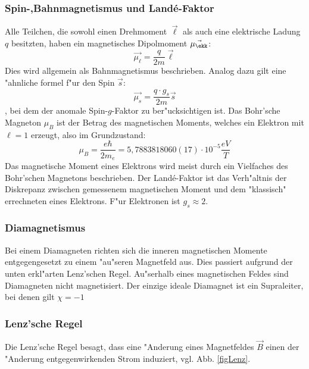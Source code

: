         \subsubsection*{Spin-,Bahnmagnetismus und Land\'e-Faktor}
            Alle Teilchen, die sowohl einen Drehmoment $\vec{\ell}$ als auch eine elektrische Ladung $q$ besitzten, haben ein magnetisches Dipolmoment $\vec{\mu_{\ekk}}$:
            \begin{equation}
                \vec{\mu_{\ell}} = \frac{q}{2m} \vec{\ell}
            \end{equation}
            Dies wird allgemein als Bahnmagnetismus beschrieben. Analog dazu gilt eine "ahnliche formel f"ur den Spin $\vec{s}$:
            \begin{equation}
                \vec{\mu_s} = \frac{q\cdot g_s}{2m} \vec{s}
            \end{equation},
            bei dem der anomale Spin-$g$-Faktor zu ber"ucksichtigen ist.
            Das Bohr'sche Magneton $\mu_B$ ist der Betrag des magnetischen Moments, welches ein Elektron
            mit $\ell=1$ erzeugt, also im Grundzustand:
            \begin{equation}
                \mu_B = \frac{e \hbar}{2 m_e} = 5,7883818060(17)\cdot 10^{-5} \frac{eV}{T}
            \end{equation}
            Das magnetische Moment eines Elektrons wird meist durch ein Vielfaches des Bohr'schen
            Magnetons beschrieben.
            Der Land\'e-Faktor ist das Verh"altnis der Diskrepanz zwischen gemessenem magnetischen Moment
            und dem "klassisch" errechneten eines Elektrons. F"ur Elektronen ist $g_s \approx 2$.
        \subsubsection*{Diamagnetismus}
            Bei einem Diamagneten richten sich die inneren magnetischen Momente entgegengesetzt
            zu einem "au"seren Magnetfeld aus. Dies passiert aufgrund der unten erkl"arten Lenz'schen Regel.
            Au"serhalb eines magnetischen Feldes sind Diamagneten
            nicht magnetisiert. Der einzige ideale Diamagnet ist ein Supraleiter, bei denen gilt $\chi = -1$
        \subsubsection*{Lenz'sche Regel}
            Die Lenz'sche Regel besagt, dass eine "Anderung eines Magnetfeldes $\vec{B}$ einen der "Anderung
            entgegenwirkenden Strom induziert, vgl. Abb. \ref{figLenz}.
            
